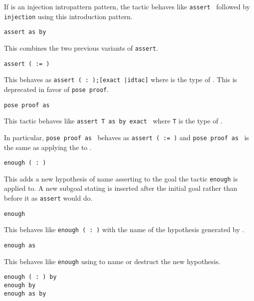 \begin{coq_example*}
\begin{Variants}
  If {\intropattern} is an injection intropattern pattern, the tactic
  behaves like \texttt{assert {\form}} followed by {\tt injection}
  using this introduction pattern.

\item \texttt{assert {\form} as {\intropattern} by {\tac}}

  This combines the two previous variants of {\tt assert}.

\item{\tt assert ( {\ident} := {\term} )}

  This behaves as {\tt assert ({\ident} :\ {\type});[exact
      {\term}|idtac]} where {\type} is the type of {\term}. This is
  deprecated in favor of {\tt pose proof}.

  \ErrMsg {}

\item \texttt{pose proof {\term} as {\intropattern}}

  This tactic behaves like \texttt{assert T as {\intropattern} by
  exact {\term}} where \texttt{T} is the type of {\term}.

  In particular, \texttt{pose proof {\term} as {\ident}} behaves as
  \texttt{assert ({\ident} := {\term})} and \texttt{pose proof {\term}
    as {\intropattern}} is the same as applying
  the {\intropattern} to {\term}.

\item \texttt{enough ({\ident} :\ {\form})}

  This adds a new hypothesis of name {\ident} asserting {\form} to the
  goal the tactic \texttt{enough} is applied to. A new subgoal stating
  \texttt{\form} is inserted after the initial goal rather than before
  it as \texttt{assert} would do.

\item \texttt{enough {\form}}

  This behaves like \texttt{enough ({\ident} :\ {\form})} with the name
  {\ident} of the hypothesis generated by {\Coq}.

\item \texttt{enough {\form} as {\intropattern}}

  This behaves like \texttt{enough} {\form} using {\intropattern} to
  name or destruct the new hypothesis.

\item \texttt{enough ({\ident} :\ {\form}) by {\tac}}\\
 \texttt{enough {\form} by {\tac}}\\
 \texttt{enough {\form} as {\intropattern} by {\tac}}


\end{Variants}
\end{coq_example*}
